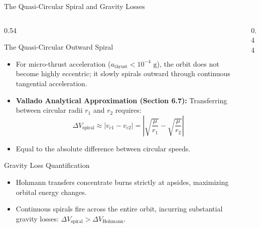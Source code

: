 \documentclass[aspectratio=169, 10pt]{beamer}
\begin{document}
\begin{frame}{The Quasi-Circular Spiral and Gravity Losses}
    \begin{columns}[T]
        \begin{column}{0.54\textwidth}
            \begin{block}{The Quasi-Circular Outward Spiral}
                \scriptsize
                \begin{itemize}\setlength{\itemsep}{2pt}\setlength{\topsep}{1pt}
                    \item For micro-thrust acceleration ($a_{\text{thrust}} < 10^{-4}\text{ g}$), the orbit does not become highly eccentric; it slowly spirals outward through continuous tangential acceleration.
                    \item \textbf{Vallado Analytical Approximation (Section 6.7):} Transferring between circular radii $r_1$ and $r_2$ requires:
                    $$\Delta V_{\text{spiral}} \approx |v_{c1} - v_{c2}| = \left|\sqrt{\frac{\mu}{r_1}} - \sqrt{\frac{\mu}{r_2}}\right|$$
                    \item Equal to the absolute difference between circular speeds.
                \end{itemize}
            \end{block}
            \vspace{-0.1cm}
            \begin{alertblock}{Gravity Loss Quantification}
                \scriptsize
                \begin{itemize}\setlength{\itemsep}{1.5pt}
                    \item Hohmann transfers concentrate burns strictly at apsides, maximizing orbital energy changes.
                    \item Continuous spirals fire across the entire orbit, incurring substantial gravity losses: $\Delta V_{\text{spiral}} > \Delta V_{\text{Hohmann}}$.
                \end{itemize}
            \end{alertblock}
        \end{column}

        \begin{column}{0.44\textwidth}
            \centering
\end{column}
\end{columns}
\end{frame}
\end{document}
